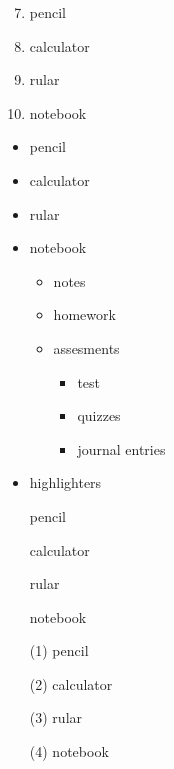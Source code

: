 \documentclass[11pt]{article}
\begin{document}
\vspace{0.1cm}
\begin{enumerate} \setcounter{enumi}{6} %
    \item pencil
    \item calculator
    \item rular
    \item notebook
\end{enumerate}

\vspace{0.1cm} %
\begin{itemize} %
    \item pencil
    \item calculator
    \item rular
    \item notebook
        \begin{itemize}
            \item notes
            \item homework
            \item assesments
                \begin{itemize}
                    \item test
                    \item quizzes
                    \item journal entries
                \end{itemize}
        \end{itemize}
    \item highlighters
\end{itemize}

\vspace{0.1cm}
\begin{enumerate} %
    \item[] pencil
    \item[] calculator
    \item[] rular
    \item[] notebook
\end{enumerate}
\vspace{0.1cm}
\begin{enumerate} %
    \item[(1)] pencil
    \item[(2)] calculator
    \item[(3)] rular
    \item[(4)] notebook
\end{enumerate}
\end{document}
